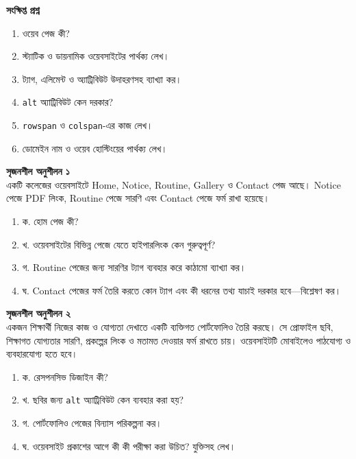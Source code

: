 \begin{practicebox}
\textbf{সংক্ষিপ্ত প্রশ্ন}
\begin{enumerate}
\item ওয়েব পেজ কী?
\item স্ট্যাটিক ও ডায়নামিক ওয়েবসাইটের পার্থক্য লেখ।
\item ট্যাগ, এলিমেন্ট ও অ্যাট্রিবিউট উদাহরণসহ ব্যাখ্যা কর।
\item \texttt{alt} অ্যাট্রিবিউট কেন দরকার?
\item \texttt{rowspan} ও \texttt{colspan}-এর কাজ লেখ।
\item ডোমেইন নাম ও ওয়েব হোস্টিংয়ের পার্থক্য লেখ।
\end{enumerate}
\end{practicebox}

\begin{practicebox}
\textbf{সৃজনশীল অনুশীলন ১}\\
একটি কলেজের ওয়েবসাইটে Home, Notice, Routine, Gallery ও Contact পেজ আছে। Notice পেজে PDF লিংক, Routine পেজে সারণি এবং Contact পেজে ফর্ম রাখা হয়েছে।

\begin{enumerate}
\item ক. হোম পেজ কী?
\item খ. ওয়েবসাইটের বিভিন্ন পেজে যেতে হাইপারলিংক কেন গুরুত্বপূর্ণ?
\item গ. Routine পেজের জন্য সারণির ট্যাগ ব্যবহার করে কাঠামো ব্যাখ্যা কর।
\item ঘ. Contact পেজের ফর্ম তৈরি করতে কোন ট্যাগ এবং কী ধরনের তথ্য যাচাই দরকার হবে—বিশ্লেষণ কর।
\end{enumerate}
\end{practicebox}

\begin{practicebox}
\textbf{সৃজনশীল অনুশীলন ২}\\
একজন শিক্ষার্থী নিজের কাজ ও যোগ্যতা দেখাতে একটি ব্যক্তিগত পোর্টফোলিও তৈরি করছে। সে প্রোফাইল ছবি, শিক্ষাগত যোগ্যতার সারণি, প্রকল্পের লিংক ও মতামত দেওয়ার ফর্ম রাখতে চায়। ওয়েবসাইটটি মোবাইলেও পাঠযোগ্য ও ব্যবহারযোগ্য হতে হবে।

\begin{enumerate}
\item ক. রেসপনসিভ ডিজাইন কী?
\item খ. ছবির জন্য \texttt{alt} অ্যাট্রিবিউট কেন ব্যবহার করা হয়?
\item গ. পোর্টফোলিও পেজের বিন্যাস পরিকল্পনা কর।
\item ঘ. ওয়েবসাইট প্রকাশের আগে কী কী পরীক্ষা করা উচিত? যুক্তিসহ লেখ।
\end{enumerate}
\end{practicebox}




